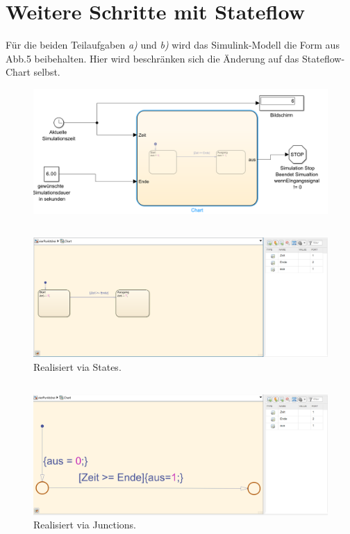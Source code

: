 \documentclass{article}
\begin{document}
	\section{Weitere Schritte mit Stateflow}
		\renewcommand{\thesubsection}{\alph{subsection})}
		Für die beiden Teilaufgaben \textit{a)} und \textit{b)} wird das Simulink-Modell die Form aus Abb.5 beibehalten. Hier wird beschränken sich die Änderung auf das Stateflow-Chart selbst.
			\begin{figure}[h]
				\centering
				\includegraphics[scale=0.6]{Aufgabe4.3a.png}
				\caption{}
				\label{fig_5: Aufg_3_a}
			\end{figure}
		\subsection{}
			\begin{figure}[h]
				\centering
				\includegraphics[scale=0.5]{Aufgabe4.3aChart.png}
				\caption{Realisiert via States.}
				\label{fig_6: Aufg_3a_Chart}
			\end{figure}
\clearpage
		\subsection{}
			\begin{figure}[h]
				\centering
				\includegraphics[scale=0.5]{Aufgabe4.3bChart.png}
				\caption{Realisiert via Junctions.}
				\label{fig_7: Aufg_3b_Chart}
			\end{figure}
\end{document}
